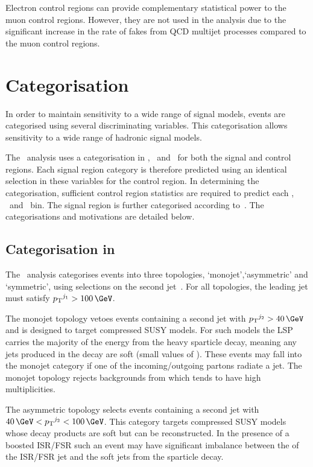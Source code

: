 Electron control regions can provide complementary statistical power to the muon control regions. 
However, they are not used in the \alphat analysis due to the significant increase in 
the rate of fakes from QCD multijet processes compared to the muon control regions. 


\section{Categorisation}
\label{sec:cat}
In order to maintain sensitivity to a wide range of signal models, events are categorised using
several discriminating variables. This categorisation allows sensitivity to a wide range of 
hadronic signal models. 

The \alphat~analysis uses a categorisation in \njet, \nb~and \scalht~for both 
the signal and control regions. Each signal region category is therefore predicted using an identical 
selection in these variables for the control region. In determining the categorisation, 
sufficient control region statistics are required to predict each \njet, \nb~and \scalht~bin. 
The signal region is further categorised according to~\mht. The categorisations and motivations are detailed below.

\subsection{Categorisation in \njet}

The \alphat~analysis categorises events into three topologies, `monojet',`asymmetric' 
and `symmetric', using selections on the second jet~\pt. For all topologies, the leading
jet must satisfy $\pt^{j_1} > 100 \,\GeV$.  

The monojet topology vetoes events containing a second 
jet with $\pt^{j_2} > 40 \,\GeV$ and is designed to target compressed SUSY models. For such models the 
LSP carries the majority of the energy from the heavy sparticle decay, meaning any jets produced 
in the decay are soft (small values of \pt). These events may fall into the monojet category if
one of the incoming/outgoing partons radiate a jet. The monojet topology rejects backgrounds from 
\ttbar which tends to have high \njet multiplicities. 

The asymmetric topology selects events containing a second jet with $40 \,\GeV < \pt^{j_2} < 100 \,\GeV$.
This category targets compressed SUSY models whose decay products are soft but can be reconstructed.
In the presence of a boosted ISR/FSR such an event may have significant imbalance between
the \pt of the ISR/FSR jet and the soft jets from the sparticle decay.

